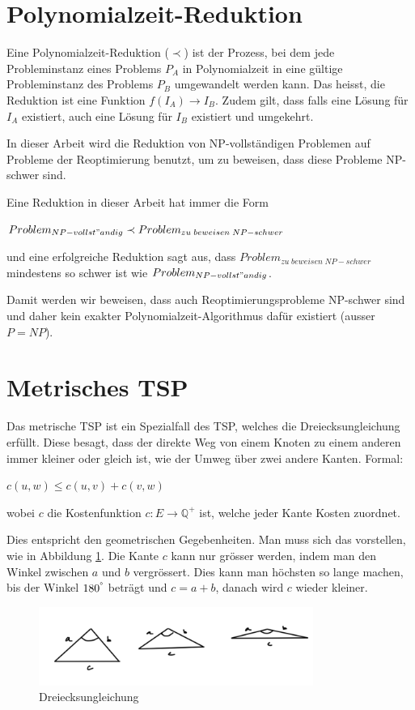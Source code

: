 \documentclass[a4paper,11pt]{scrreprt}
\begin{document}
\section{Polynomialzeit-Reduktion}

Eine Polynomialzeit-Reduktion ($\prec$) ist der Prozess, bei dem jede Probleminstanz eines Problems $P_A$ in Polynomialzeit in eine gültige Probleminstanz des Problems $P_B$ umgewandelt werden kann. Das heisst, die 
Reduktion ist eine Funktion $f(I_A) \rightarrow I_B$. Zudem gilt, dass falls
eine Lösung für $I_A$ existiert, auch eine Lösung für $I_B$ existiert und umgekehrt.

In dieser Arbeit wird die Reduktion von NP-vollständigen Problemen auf Probleme
der Reoptimierung benutzt, um zu beweisen, dass diese Probleme NP-schwer sind.

Eine Reduktion in dieser Arbeit hat immer die Form 

$Problem_{NP-vollst"andig} \prec Problem_{zu\; beweisen\; NP-schwer}$ 

und eine erfolgreiche Reduktion sagt aus, dass $Problem_{zu\; beweisen\; NP-schwer}$ mindestens so schwer ist wie $Problem_{NP-vollst"andig}$.

Damit werden wir beweisen, dass auch Reoptimierungsprobleme NP-schwer sind und daher kein exakter Polynomialzeit-Algorithmus dafür existiert (ausser $P = NP$).

\section{Metrisches TSP}

Das metrische TSP ist ein Spezialfall des TSP, welches die Dreiecksungleichung erfüllt. Diese besagt, dass der direkte Weg von einem Knoten zu einem anderen immer kleiner oder gleich ist, wie der Umweg über zwei andere Kanten. Formal:

$c({u, w}) \le c({u, v}) + c({v, w})$

wobei $c$ die Kostenfunktion $c: E \rightarrow \mathbb{Q}^+$ ist, welche jeder Kante Kosten zuordnet.

Dies entspricht den geometrischen Gegebenheiten. Man muss sich das vorstellen,
wie in Abbildung \ref{fig:trangle-inequality}. Die Kante $c$ kann nur grösser 
werden, indem man den Winkel zwischen $a$ und $b$ vergrössert. Dies kann man 
höchsten so lange machen, bis der Winkel $180^\degree$ beträgt und $c = a + b$, danach
wird $c$ wieder kleiner.

\begin{figure}[H]
\centering
\includegraphics[width=0.8\textwidth]{triangle_inequality1.png}
\caption{Dreiecksungleichung}
\label{fig:trangle-inequality}
\end{figure}
\end{document}
